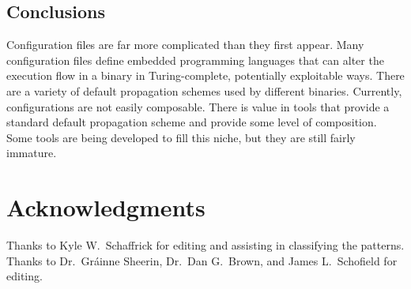 \documentclass[letterpaper,twocolumn,10pt]{article}
\begin{document}
\subsection{Conclusions}

Configuration files are far more complicated than they first appear. Many configuration files define embedded programming languages that can alter the execution flow in a binary in Turing-complete, potentially exploitable ways. There are a variety of default propagation schemes used by different binaries. Currently, configurations are not easily composable. There is value in tools that provide a standard default propagation scheme and provide some level of composition. Some tools are being developed to fill this niche, but they are still fairly immature.

\section{Acknowledgments}
Thanks to Kyle W.~Schaffrick for editing and assisting in classifying the patterns. Thanks to Dr.~Gr\'ainne Sheerin, Dr.~Dan G.~Brown, and James L.~Schofield for editing.

{\footnotesize 
}

\theendnotes
\end{document}
